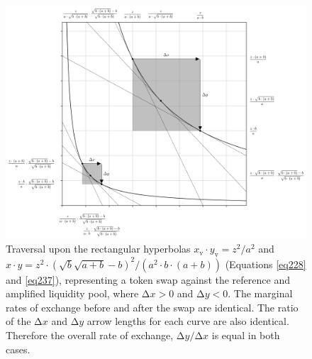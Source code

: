 \documentclass{article}
\begin{document}
\begin{figure}[ht]
    \centering
    \includegraphics[width=\textwidth]{fig48.png}
    \captionsetup{
        justification=raggedright,
        singlelinecheck=false,
        font=small,
        labelfont=bf,
        labelsep=quad,
        format=plain
    }
    \caption{Traversal upon the rectangular hyperbolas $x_{\text{v}} \cdot y_{\text{v}} = z^{2} / a^{2}$ and $x \cdot y = z^{2} \cdot \left( \sqrt{b} \sqrt{a + b} - b \right)^{2} / \left( a^{2} \cdot b \cdot \left( a +b \right) \right)$ (Equations \ref{eq228} and  \ref{eq237}), representing a token swap against the reference and amplified liquidity pool, where $\mathrm{\Delta}x > 0$ and $\mathrm{\Delta}y < 0$. The marginal rates of exchange before and after the swap are identical. The ratio of the $\mathrm{\Delta}x$ and $\mathrm{\Delta}y$ arrow lengths for each curve are also identical. Therefore the overall rate of exchange, $\mathrm{\Delta}y / \mathrm{\Delta}x$ is equal in both cases.}
    \label{fig48}
\end{figure}
\end{document}
